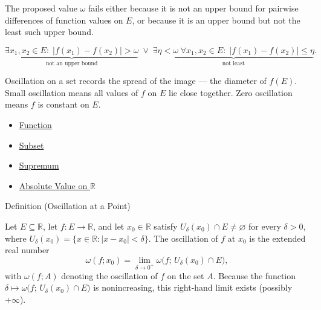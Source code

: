 \begin{remark*}
The proposed value $\omega$ fails either because it is not an upper
bound for pairwise differences of function values on $E$, or because it
is an upper bound but not the least such upper bound.
\end{remark*}

\begin{remark*}
\[
\underbrace{\exists x_1,x_2\in E:\; |f(x_1)-f(x_2)|>\omega}_{\text{not an upper bound}}
\;\lor\;
\underbrace{\exists \eta<\omega\; \forall x_1,x_2\in E:\; |f(x_1)-f(x_2)|\le \eta}_{\text{not least}}.
\]
\end{remark*}

\begin{remark*}[Interpretation]
Oscillation on a set records the spread of the image --- the diameter
of $f(E)$. Small oscillation means all values of $f$ on $E$ lie
close together. Zero oscillation means $f$ is constant on $E$.
\end{remark*}

\begin{dependencies}
\begin{itemize}
  \item \hyperref[def:function]{Function}
  \item \hyperref[def:subset]{Subset}
  \item \hyperref[def:supremum]{Supremum}
  \item \hyperref[def:real-chapter-absolute-value-on-r]{Absolute Value on $\mathbb{R}$}
\end{itemize}
\end{dependencies}

\begin{definitionbox}{Definition (Oscillation at a Point)}
\begin{definition}
\label{def:oscillation-at-a-point}
Let $E \subseteq \mathbb{R}$, let $f:E \to \mathbb{R}$, and let $x_0 \in \mathbb{R}$ satisfy $U_\delta(x_0)\cap E \neq \varnothing$ for every $\delta>0$, where $U_\delta(x_0)=\{x \in \mathbb{R}: |x-x_0|<\delta\}$. The oscillation of $f$ at $x_0$ is the extended real number
\[
\omega(f;x_0)
=
\lim_{\delta \to 0^+}
\omega\bigl(f;\,U_\delta(x_0)\cap E\bigr),
\]
with $\omega(f;A)$ denoting the oscillation of $f$ on the set $A$. Because the function $\delta \mapsto \omega\bigl(f;\,U_\delta(x_0)\cap E\bigr)$ is nonincreasing, this right-hand limit exists (possibly $+\infty$).
\end{definition}
\end{definitionbox}

